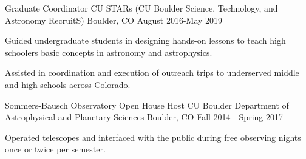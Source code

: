 

\begin{cventries}

  \cventry
    {Graduate Coordinator} %
    {CU STARs (CU Boulder Science, Technology, and Astronomy RecruitS)} %
    {Boulder, CO} %
    {August 2016-May 2019} %
    {
      \begin{cvitems} %
        \item {Guided undergraduate students in designing hands-on lessons to
				teach high schoolers basic concepts in astronomy and astrophysics.}
        \item {Assisted in coordination and execution of outreach trips to underserved
				middle and high schools across Colorado.}
      \end{cvitems}
    }
  \cventry
    {Sommers-Bausch Observatory Open House Host} %
    {CU Boulder Department of Astrophysical and Planetary Sciences} %
    {Boulder, CO} %
    {Fall 2014 - Spring 2017} %
    {
      \begin{cvitems} %
        \item {Operated telescopes and interfaced with the public during free observing nights once or twice per semester.}
      \end{cvitems}
    }





\end{cventries}
